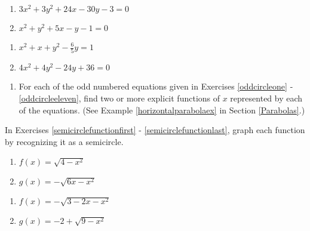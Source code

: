 \begin{multicols}{2}
\begin{enumerate}
\setcounter{enumi}{\value{HW}}


\item $3x^2+3y^2+24x-30y -3 =0$  \label{oddcirclenine}
\item $x^2+y^2+5x-y-1=0$

\setcounter{HW}{\value{enumi}}
\end{enumerate}
\end{multicols}

\begin{multicols}{2}
\begin{enumerate}
\setcounter{enumi}{\value{HW}}


\item $x^{2} + x + y^{2} - \frac{6}{5}y = 1$  \label{oddcircleeleven}
\item $4x^{2} + 4y^{2} - 24y + 36 = 0$ \label{ctscirclelast}

\setcounter{HW}{\value{enumi}}
\end{enumerate}
\end{multicols}

\begin{enumerate}
\setcounter{enumi}{\value{HW}}

\item For each of the odd numbered equations given in Exercises \ref{oddcircleone} - \ref{oddcircleeleven}, find two or more explicit functions of $x$ represented by each of the equations.  (See Example \ref{horizontalparabolaex} in Section \ref{Parabolas}.)

\setcounter{HW}{\value{enumi}}
\end{enumerate}


In Exercises \ref{semicirclefunctionfirst} - \ref{semicirclefunctionlast}, graph each function by recognizing it as a semicircle.

\begin{multicols}{2}
\begin{enumerate}
\setcounter{enumi}{\value{HW}}

\item   $f(x) = \sqrt{4-x^2}$ \label{semicirclefunctionfirst}
\item   $g(x) = -\sqrt{6x-x^2}$

\setcounter{HW}{\value{enumi}}
\end{enumerate}
\end{multicols}

\begin{multicols}{2}
\begin{enumerate}
\setcounter{enumi}{\value{HW}}

\item  $f(x) = -\sqrt{3-2x-x^2}$
\item  $g(x) = -2 + \sqrt{9-x^2}$ \label{semicirclefunctionlast}

\setcounter{HW}{\value{enumi}}
\end{enumerate}
\end{multicols}

